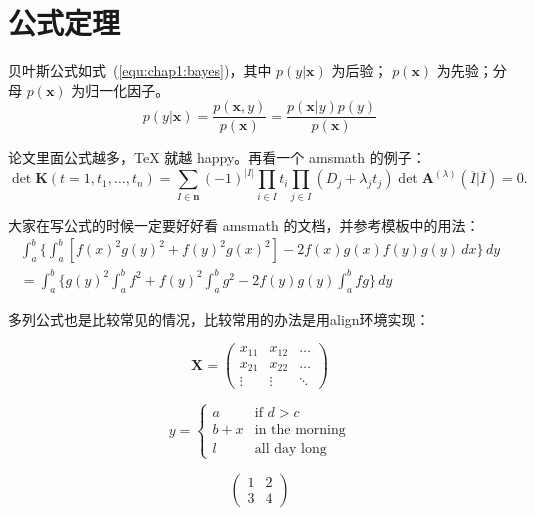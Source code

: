 \section{公式定理}
\label{sec:equation}
贝叶斯公式如式~(\ref{equ:chap1:bayes})，其中 $p(y|\mathbf{x})$ 为后验；
$p(\mathbf{x})$ 为先验；分母 $p(\mathbf{x})$ 为归一化因子。
\begin{equation}
\label{equ:chap1:bayes}
p(y|\mathbf{x}) = \frac{p(\mathbf{x},y)}{p(\mathbf{x})}=
\frac{p(\mathbf{x}|y)p(y)}{p(\mathbf{x})} 
\end{equation}

论文里面公式越多，\TeX{} 就越 happy。再看一个 \textsf{amsmath} 的例子：
\newcommand{\envert}[1]{\left\lvert#1\right\rvert} 
\begin{equation}\label{detK2}
\det\mathbf{K}(t=1,t_1,\dots,t_n)=\sum_{I\in\mathbf{n}}(-1)^{\envert{I}}
\prod_{i\in I}t_i\prod_{j\in I}(D_j+\lambda_jt_j)\det\mathbf{A}
^{(\lambda)}(\overline{I}|\overline{I})=0.
\end{equation} 

大家在写公式的时候一定要好好看 \textsf{amsmath} 的文档，并参考模板中的用法：
\begin{multline*}%
\int_a^b\biggl\{\int_a^b[f(x)^2g(y)^2+f(y)^2g(x)^2]
 -2f(x)g(x)f(y)g(y)\,dx\biggr\}\,dy \\
 =\int_a^b\biggl\{g(y)^2\int_a^bf^2+f(y)^2
  \int_a^b g^2-2f(y)g(y)\int_a^b fg\biggr\}\,dy
\end{multline*}

多列公式也是比较常见的情况，比较常用的办法是用align环境实现：

\begin{equation} 
\mathbf{X} = \left(\begin{array}{ccc} 
x_{11} & x_{12} & \ldots \\ 
x_{21} & x_{22} & \ldots \\ 
\vdots & \vdots & \ddots \end{array} \right) 
\end{equation} 

\begin{equation} 
y = \left\{ \begin{array}{ll} 
a & \textrm{if $d>c$}\\ 
b+x & \textrm{in the morning}\\ 
l & \textrm{all day long} 
\end{array} \right. 
\end{equation} 

\begin{equation} 
\left(\begin{array}{c|c} 
1 & 2 \\ 
\hline 3 & 4 \end{array}\right) 
\end{equation}   


